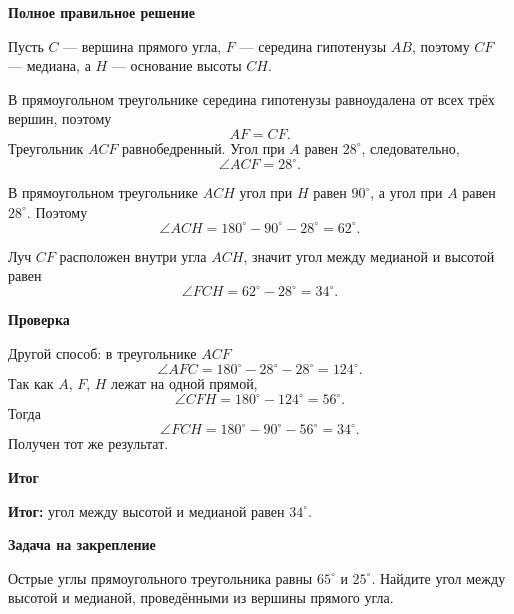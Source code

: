 \documentclass[12pt,a4paper]{article}
\newcommand{\resultlabel}{\textcolor{teal!60!black}{\textbf{Итог:}}}
\newcommand{\subhead}[1]{\par\medskip\textbf{#1}\par}
\begin{document}
\subhead{Полное правильное решение}
Пусть $C$ --- вершина прямого угла, $F$ --- середина гипотенузы $AB$, поэтому $CF$ --- медиана, а $H$ --- основание высоты $CH$.

В прямоугольном треугольнике середина гипотенузы равноудалена от всех трёх вершин, поэтому
\[
AF=CF.
\]
Треугольник $ACF$ равнобедренный. Угол при $A$ равен $28^\circ$, следовательно,
\[
\angle ACF=28^\circ.
\]

В прямоугольном треугольнике $ACH$ угол при $H$ равен $90^\circ$, а угол при $A$ равен $28^\circ$. Поэтому
\[
\angle ACH=180^\circ-90^\circ-28^\circ=62^\circ.
\]

Луч $CF$ расположен внутри угла $ACH$, значит угол между медианой и высотой равен
\[
\angle FCH=62^\circ-28^\circ=34^\circ.
\]

\subhead{Проверка}
Другой способ: в треугольнике $ACF$
\[
\angle AFC=180^\circ-28^\circ-28^\circ=124^\circ.
\]
Так как $A$, $F$, $H$ лежат на одной прямой,
\[
\angle CFH=180^\circ-124^\circ=56^\circ.
\]
Тогда
\[
\angle FCH=180^\circ-90^\circ-56^\circ=34^\circ.
\]
Получен тот же результат.

\subhead{Итог}
\resultlabel{} угол между высотой и медианой равен $34^\circ$.

\subhead{Задача на закрепление}
Острые углы прямоугольного треугольника равны $65^\circ$ и $25^\circ$. Найдите угол между высотой и медианой, проведёнными из вершины прямого угла.
\end{document}
